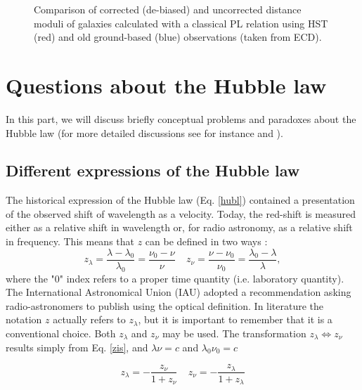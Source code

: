 \begin{figure}[!]
\caption{Comparison of corrected  (de-biased) and uncorrected distance moduli of galaxies calculated with a classical PL relation using HST  (red) and old ground-based (blue) observations (taken from ECD).}
\label{ground} 
\end{figure}   


\section{Questions about the Hubble law}
\label{sec4}
In this part, we will discuss briefly conceptual problems and paradoxes about the Hubble law 
(for more detailed discussions see for instance \cite{tb} and \cite{paradox}). 

\subsection{Different expressions of the Hubble law }
\label{sec4.1}
The historical expression of the Hubble law (Eq. \ref{hubl}) contained a presentation of the observed shift of wavelength as a velocity. Today, the red-shift is measured either as a relative shift in wavelength or, for radio astronomy, as a relative shift in frequency. This means that $z$ can be defined in two ways :
\begin{equation}
z_{\lambda}= \frac {\lambda - \lambda_0}  {\lambda_0} =  \frac {\nu_0 - \nu} {\nu}   \  \  \  \  \    z_{\nu}= \frac {\nu - \nu_0} {\nu_0}=  \frac {\lambda_0 - \lambda}  {\lambda} ,
\label{zis}
\end{equation}
where the "0" index refers to a proper time quantity (i.e. laboratory quantity). The International Astronomical Union (IAU) adopted a recommendation asking radio-astronomers to publish using the optical definition. In  literature the notation $z$ actually refers to $z_{\lambda}$, but it is important to remember that it is a conventional choice.
Both $z_{\lambda}$ and $z_{\nu}$ may be used. 
The transformation $z_{\lambda} \iff z_{\nu}$  results simply from  Eq. \ref {zis}, and $\lambda \nu=c$ and $\lambda_0 \nu_0=c$ 

\begin{equation}
z_{\lambda}= - \frac {z_\nu} {1 + z_{\nu}}   \  \  \  \  \  z_{\nu}= - \frac {z_{\lambda}} {1+ z_{\lambda}} 
\label{zl2zn}
\end{equation}


